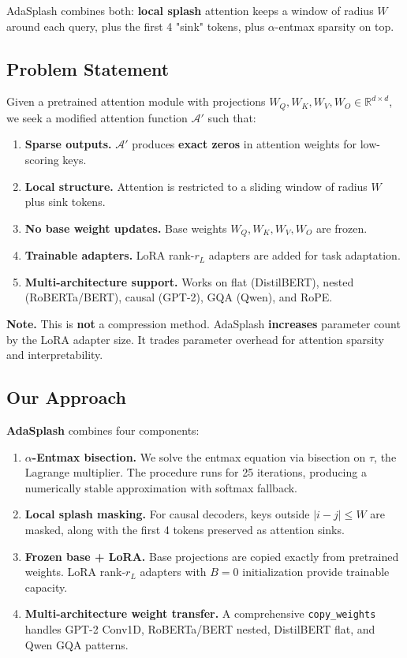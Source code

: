 AdaSplash combines both: \textbf{local splash} attention keeps a window of radius 
$W$ around each query, plus the first 4 "sink" tokens, plus $\alpha$-entmax 
sparsity on top.

\subsection{Problem Statement}

Given a pretrained attention module with projections 
$W_Q, W_K, W_V, W_O \in \mathbb{R}^{d \times d}$, we seek a modified attention 
function $\mathcal{A}'$ such that:

\begin{enumerate}
\item \textbf{Sparse outputs.} $\mathcal{A}'$ produces \textbf{exact zeros} in attention
  weights for low-scoring keys.
\item \textbf{Local structure.} Attention is restricted to a sliding window of radius
  $W$ plus sink tokens.
\item \textbf{No base weight updates.} Base weights $W_Q, W_K, W_V, W_O$ are frozen.
\item \textbf{Trainable adapters.} LoRA rank-$r_L$ adapters are added for task adaptation.
\item \textbf{Multi-architecture support.} Works on flat (DistilBERT), nested
  (RoBERTa/BERT), causal (GPT-2), GQA (Qwen), and RoPE.

\end{enumerate}
\textbf{Note.} This is \textbf{not} a compression method. AdaSplash \textbf{increases} 
parameter count by the LoRA adapter size. It trades parameter overhead for 
attention sparsity and interpretability.

\subsection{Our Approach}

\textbf{AdaSplash} combines four components:

\begin{enumerate}
\item \textbf{$\alpha$-Entmax bisection.} We solve the entmax equation via bisection on
  $\tau$, the Lagrange multiplier. The procedure runs for 25 iterations,
  producing a numerically stable approximation with softmax fallback.

\item \textbf{Local splash masking.} For causal decoders, keys outside $|i - j| \leq W$
  are masked, along with the first 4 tokens preserved as attention sinks.

\item \textbf{Frozen base + LoRA.} Base projections are copied exactly from pretrained
  weights. LoRA rank-$r_L$ adapters with $B = 0$ initialization provide
  trainable capacity.

\item \textbf{Multi-architecture weight transfer.} A comprehensive \texttt{copy\_weights}
  handles GPT-2 Conv1D, RoBERTa/BERT nested, DistilBERT flat, and Qwen
  GQA patterns.

\end{enumerate}
